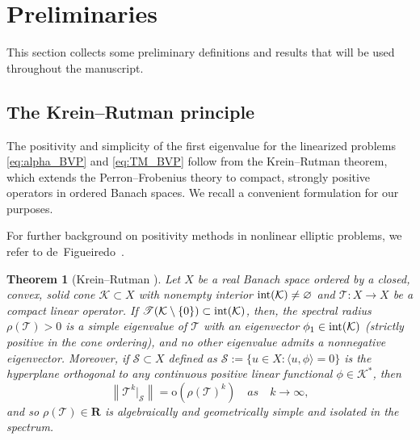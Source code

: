 \documentclass[reqno,11pt]{amsart}
\newtheorem{theoremletter}{Theorem}
\theoremstyle{definition}
\begin{document}
\section{Preliminaries}\label{sec:preliminaries}
This section collects some preliminary definitions and results that will be used throughout the manuscript.

\subsection{The Krein--Rutman principle}
The positivity and simplicity of the first eigenvalue for the linearized problems
\eqref{eq:alpha_BVP} and \eqref{eq:TM_BVP} follow from the Krein--Rutman theorem,
which extends the Perron--Frobenius theory to compact, strongly positive operators
in ordered Banach spaces.  We recall a convenient formulation for our purposes.

For further background on positivity methods in nonlinear elliptic problems, we 
refer to de~Figueiredo~\cite[Proposition~1.12A, Theorem~1.13]{deFigueiredo1982}.

\begin{theoremletter}[Krein--Rutman \cite{MR2759829}]\label{thm:krein-rutman}
Let $X$ be a real Banach space ordered by a closed, convex, solid cone $\mathcal{K}\subset X$ with 
nonempty interior ${\rm int}(\mathcal{K})\neq \varnothing$ and $\mathscr{T}:X\to X$ be a compact linear 
operator.
If $\mathscr{T}(\mathcal{K}\setminus\{0\})\subset {\rm int}(\mathcal{K})$, then, the spectral 
radius $\rho(\mathscr{T})>0$ is a simple eigenvalue of $\mathscr{T}$ with an eigenvector 
$\phi_1\in {\rm int}(\mathcal{K})$ (strictly positive in the cone ordering),
and no other eigenvalue admits a nonnegative eigenvector.
Moreover, if $\mathcal{S}\subset X$ defined as $\mathcal{S}:=\{u\in X :\langle u,\phi\rangle=0\}$ 
is the hyperplane orthogonal to any
continuous positive linear functional $\phi\in \mathcal{K}^*$, then
\[
\left\|\mathscr{T}^k\big|_{\mathcal{S}}\right\|=\mathrm{o}(\rho(\mathscr{T})^k)\quad as \quad k\to\infty,
\]
and so $\rho(\mathscr{T})\in\mathbf{R}$ is algebraically and geometrically simple and isolated in the spectrum.
\end{theoremletter}
\end{document}
